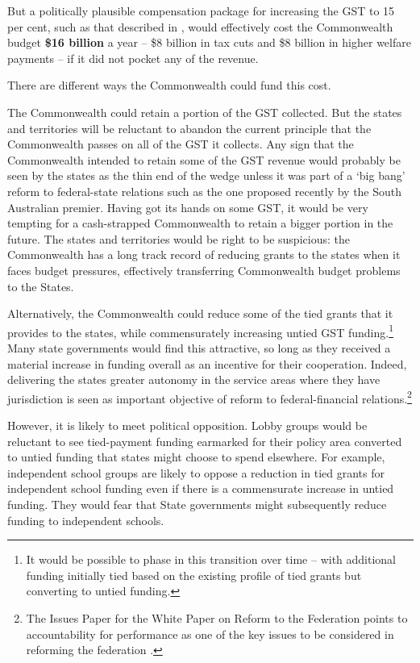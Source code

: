 \documentclass{grattanAlpha}
\begin{document}
But a politically plausible compensation package for increasing the GST to 15 per cent, such as that described in , would effectively cost the Commonwealth budget \textbf{\$16 billion} a year – \$8 billion in tax cuts and \$8 billion in higher welfare payments – if it did not pocket any of the revenue. 

There are different ways the Commonwealth could fund this cost. 

The Commonwealth could retain a portion of the GST collected. But the states and territories will be reluctant to abandon the current principle that the Commonwealth passes on all of the GST it collects. Any sign that the Commonwealth intended to retain some of the GST revenue would probably be seen by the states as the thin end of the wedge  unless it was part of a ‘big bang’ reform to federal-state relations such as the one proposed recently by the South Australian premier.  Having got its hands on some GST, it would be very tempting for a cash-strapped Commonwealth to retain a bigger portion in the future. The states and territories would be right to be suspicious: the Commonwealth has a long track record of reducing grants to the states when it faces budget pressures, effectively transferring Commonwealth budget problems to the States.

Alternatively, the Commonwealth could reduce some of the tied grants that it provides to the states, while commensurately increasing untied GST funding.\footnote{It would be possible to phase in this transition over time – with additional funding initially tied based on the existing profile of tied grants but converting to untied funding.}  Many state governments would find this attractive, so long as they received a material increase in funding overall as an incentive for their cooperation. Indeed, delivering the states greater autonomy in the service areas where they have jurisdiction is seen as important objective of reform to federal-financial relations.\footnote{The Issues Paper for the White Paper on Reform to the Federation points to accountability for performance as one of the key issues to be considered in reforming the federation \textcite[][13--25]{PrimeMinisterCabinet2014a}.}  

However, it is likely to meet political opposition. Lobby groups would be reluctant to see tied-payment funding earmarked for their policy area converted to untied funding that states might choose to spend elsewhere. For example, independent school groups are likely to oppose a reduction in tied grants for independent school funding even if there is a commensurate increase in untied funding. They would fear that State governments might subsequently reduce funding to independent schools.
\end{document}
